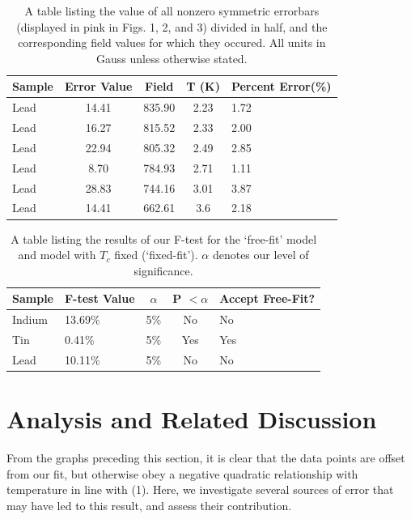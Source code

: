 \documentclass[aps,prl,nofootinbib,twocolumn,superscriptaddress,groupedaddress]{revtex4}  %
\begin{document}
\begin{table}
\caption{\label{tab:table1} A table listing the value of all nonzero symmetric errorbars (displayed in pink in Figs. 1, 2, and 3) divided in half, and the corresponding field values for which they occured. All units in Gauss unless otherwise stated.}
\begin{ruledtabular}
\begin{tabular}{lcccP{0.15\textwidth}}
Sample&Error Value& Field& T (K)& Percent Error(\%)\\
\hline
Lead & 14.41 & 835.90& 2.23&  1.72\\
Lead & 16.27 & 815.52 & 2.33 & 2.00\\
Lead & 22.94 & 805.32 & 2.49 & 2.85\\
Lead & 8.70 & 784.93 & 2.71 & 1.11\\
Lead & 28.83 & 744.16 & 3.01 & 3.87\\
Lead & 14.41 & 662.61 & 3.6 & 2.18\\
\end{tabular}
\end{ruledtabular}
\end{table}

\begin{table}
\caption{A table listing the results of our F-test for the `free-fit' model and model with $T_{c}$ fixed (`fixed-fit'). $\alpha$ denotes our level of significance.}
\begin{ruledtabular}
\begin{tabular}{lP{0.15\textwidth}ccP{0.15\textwidth}}
Sample& F-test Value & $\alpha$ & P  $< \alpha$& Accept Free-Fit? \\
\hline
Indium  & 13.69\% & 5\% & No & No\\
Tin & 0.41\% & 5\% & Yes & Yes \\
Lead & 10.11\% & 5\% & No & No \\

\end{tabular}
\end{ruledtabular}
\end{table}

\section{\label{sec:level2}Analysis and Related Discussion}
From the graphs preceding this section, it is clear that the data points are offset from our fit, but otherwise obey a negative quadratic relationship with temperature in line with (1). Here, we investigate several sources of error that may have led to this result, and assess their contribution.  
\end{document}
